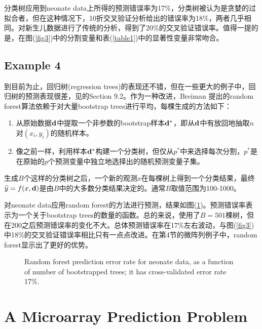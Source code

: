 \documentclass[lang=cn,11pt,a4paper,cite=authoryear]{elegantpaper}
\begin{document}
分类树应用到neonate data上所得的预测错误率为17\%，分类树被认为是贪婪的过拟合者，但在这种情况下，10折交叉验证分析给出的错误率为18\%，两者几乎相同。\cite{mediratta2020derivation}对新生儿数据进行了传统的分析，得到了20\%的交叉验证错误率。值得一提的是，在图(\ref{fig3})中的分割变量和表(\ref{table1})中的显著性变量非常吻合。

\subsection{Example 4}

到目前为止，回归树(regression trees)的表现还不错，但在一些更大的例子中，回归树的预测表现很差，见\cite{breiman2001statistical}的Section 9.2。作为一种改进，Breiman 提出的random forest算法依赖于对大量bootstrap trees进行平均，每棵生成的方法如下：
\begin{enumerate}
	\item 从原始数据$\bold{d}$中提取一个非参数的bootstrap样本$\bold{d}^{*}$，即从$\bold{d}$中有放回地抽取$n$对$(x_i, y_i)$的随机样本。
	\item 像之前一样，利用样本$\bold{d}^{*}$构建一个分类树，但仅从$p^{*}$中来选择每次分割，$p^{*}$是在原始的$p$个预测变量中独立地选择出的随机预测变量子集。
\end{enumerate}

生成$B$个这样的分类树之后，一个新的观测$x$在每棵树上得到一个分类结果，最终$\widehat{y} = f(x, \bold{d})$是由$B$中的大多数分类结果决定的。通常$B$取值范围为100-1000。

对neonate data应用random forest的方法进行预测，结果如图(\ref{fig4})。预测错误率表示为一个关于bootstrap trees的数量的函数。总的来说，使用了$B=501$棵树，但在200之后预测错误率的变化不大。总体预测错误率在17\%左右波动，与图(\ref{fig3})中18\%的交叉验证错误率相比只有一点点改进。在第4节的微阵列例子中，random forest显示出了更好的优势。
\begin{figure}[H]
		\centering
		\caption{Random forest prediction error rate for neonate data, as a function of number of bootstrapped trees; it has cross-validated error rate 17\%.}
		\label{fig4}
\end{figure}

\section{A Microarray Prediction Problem}
\end{document}
